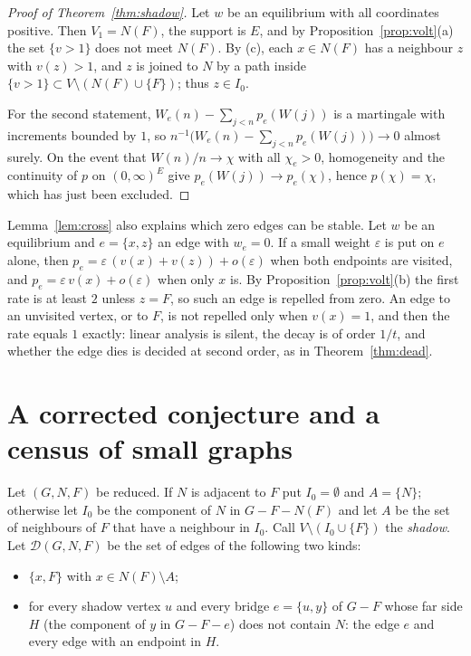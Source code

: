 \documentclass[11pt]{amsart}
\theoremstyle{remark}
\begin{document}
\begin{proof}[Proof of Theorem~\ref{thm:shadow}]
Let $w$ be an equilibrium with all coordinates positive. Then $V_1=N(F)$, the support is $E$, and by
Proposition~\ref{prop:volt}(a) the set $\{v>1\}$ does not meet $N(F)$. By (c), each $x\in N(F)$ has a neighbour $z$
with $v(z)>1$, and $z$ is joined to $N$ by a path inside $\{v>1\}\subset V\setminus(N(F)\cup\{F\})$; thus $z\in I_0$.

For the second statement, $W_e(n)-\sum_{j<n}p_e(W(j))$ is a martingale with increments bounded by $1$, so
$n^{-1}\bigl(W_e(n)-\sum_{j<n}p_e(W(j))\bigr)\to0$ almost surely. On the event that $W(n)/n\to\chi$ with all
$\chi_e>0$, homogeneity and the continuity of $p$ on $(0,\infty)^E$ give $p_e(W(j))\to p_e(\chi)$, hence
$p(\chi)=\chi$, which has just been excluded.
\end{proof}

Lemma~\ref{lem:cross} also explains which zero edges can be stable. Let $w$ be an equilibrium and $e=\{x,z\}$ an
edge with $w_e=0$. If a small weight $\varepsilon$ is put on $e$ alone, then $p_e=\varepsilon\,(v(x)+v(z))+o(\varepsilon)$
when both endpoints are visited, and $p_e=\varepsilon\,v(x)+o(\varepsilon)$ when only $x$ is. By
Proposition~\ref{prop:volt}(b) the first rate is at least $2$ unless $z=F$, so such an edge is repelled from zero. An
edge to an unvisited vertex, or to $F$, is not repelled only when $v(x)=1$, and then the rate equals $1$ exactly:
linear analysis is silent, the decay is of order $1/t$, and whether the edge dies is decided at second order, as in
Theorem~\ref{thm:dead}.

\section{A corrected conjecture and a census of small graphs}\label{sec:census}

Let $(G,N,F)$ be reduced. If $N$ is adjacent to $F$ put $I_0=\emptyset$ and $A=\{N\}$; otherwise let $I_0$ be the
component of $N$ in $G-F-N(F)$ and let $A$ be the set of neighbours of $F$ that have a neighbour in $I_0$. Call
$V\setminus(I_0\cup\{F\})$ the \emph{shadow}. Let $\mathcal D(G,N,F)$ be the set of edges of the following two kinds:
\begin{itemize}
\item[(D1)] $\{x,F\}$ with $x\in N(F)\setminus A$;
\item[(D2)] for every shadow vertex $u$ and every bridge $e=\{u,y\}$ of $G-F$ whose far side $H$ (the component of $y$
in $G-F-e$) does not contain $N$: the edge $e$ and every edge with an endpoint in $H$.
\end{itemize}
\end{document}
